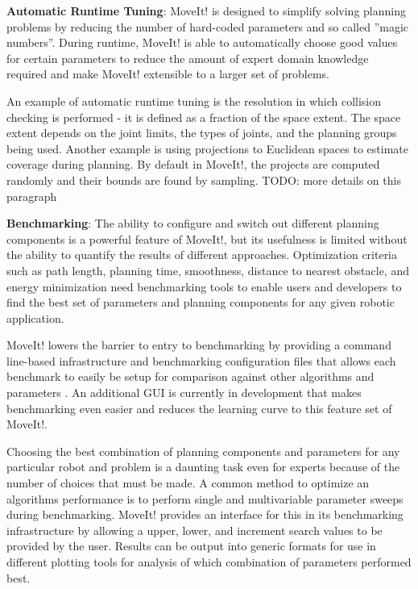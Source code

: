 \documentclass[10pt,journal,compsoc]{joser1}
\begin{document}
{{\bf Automatic Runtime Tuning}: MoveIt! is designed to simplify solving planning problems by reducing the number of hard-coded parameters and so called ''magic numbers''. During runtime, MoveIt! is able to automatically choose good values for certain parameters to reduce the amount of expert domain knowledge required and make MoveIt! extensible to a larger set of problems. 

An example of automatic runtime tuning is the resolution in which collision checking is performed - it is defined as a fraction of the space extent. The space extent depends on the joint limits, the types of joints, and the planning groups being used. Another example is using projections to Euclidean spaces to estimate coverage during planning. By default in MoveIt!, the projects are computed randomly and their bounds are found by sampling. TODO: more details on this paragraph

{\bf Benchmarking}: The ability to configure and switch out different planning components is a powerful feature of MoveIt!, but its usefulness is limited without the ability to quantify the results of different approaches. Optimization criteria such as path length, planning time, smoothness, distance to nearest obstacle, and energy minimization need benchmarking tools to enable users and developers to find the best set of parameters and planning components for any given robotic application.

MoveIt! lowers the barrier to entry to benchmarking by providing a command line-based infrastructure and benchmarking configuration files that allows each benchmark to easily be setup for comparison against other algorithms and parameters \cite{cohen2012generic}. An additional GUI is currently in development that makes benchmarking even easier and reduces the learning curve to this feature set of MoveIt!.

Choosing the best combination of planning components and parameters for any particular robot and problem is a daunting task even for experts because of the number of choices that must be made\cite{cohen2012generic}. A common method to optimize an algorithms performance is to perform single and multivariable parameter sweeps during benchmarking. MoveIt! provides an interface for this in its benchmarking infrastructure by allowing a upper, lower, and increment search values to be provided by the user. Results can be output into generic formats for use in different plotting tools for analysis of which combination of parameters performed best.

}
\end{document}
